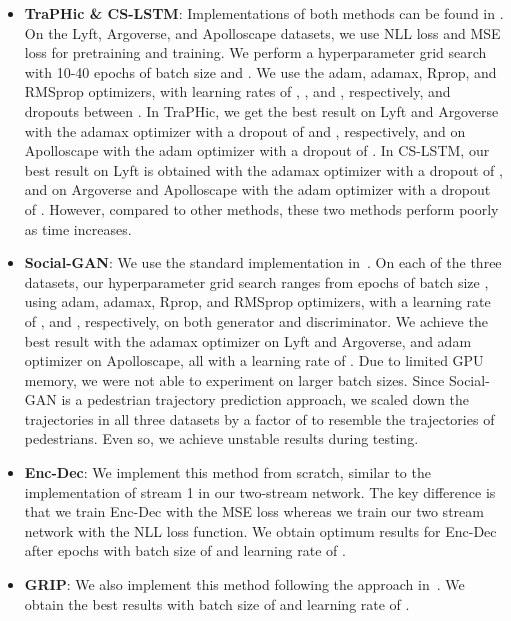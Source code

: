 \documentclass[10pt,twocolumn,letterpaper]{article}
\theoremstyle{plain}
\begin{document}
\begin{itemize}
    \item \textbf{TraPHic \& CS-LSTM}: Implementations of both methods can be found in \cite{chandra2019robusttp}. On the Lyft, Argoverse, and Apolloscape datasets, we use NLL loss and MSE loss for pretraining and training. We perform a hyperparameter grid search with 10-40 epochs of batch size  and . We use the adam, adamax, Rprop, and RMSprop optimizers, with learning rates of , , and , respectively, and dropouts between . In TraPHic, we get the best result on Lyft and Argoverse with the adamax optimizer with a dropout of  and , respectively, and on Apolloscape with the adam optimizer with a dropout of . In CS-LSTM, our best result on Lyft is obtained with the adamax optimizer with a dropout of , and on Argoverse and Apolloscape with the adam optimizer with a dropout of . However, compared to other methods, these two methods perform poorly as time increases.
    
    \item \textbf{Social-GAN}: We use the standard implementation in~\cite{social-gan}. On each of the three datasets, our hyperparameter grid search ranges from  epochs of batch size , using adam, adamax, Rprop, and RMSprop optimizers, with a learning rate of ,  and , respectively, on both generator and discriminator. We achieve the best result with the adamax optimizer on Lyft and Argoverse, and adam optimizer on Apolloscape, all with a learning rate of . Due to limited GPU memory, we were not able to experiment on larger batch sizes. Since Social-GAN is a pedestrian trajectory prediction approach, we scaled down the trajectories in all three datasets by a factor of  to resemble the trajectories of pedestrians. Even so, we achieve unstable results during testing.


    \item \textbf{Enc-Dec}: We implement this method from scratch, similar to the implementation of stream 1 in our two-stream network. The key difference is that we train Enc-Dec with the MSE loss whereas we train our two stream network with the NLL loss function. We obtain optimum results for Enc-Dec after  epochs with batch size of  and learning rate of .

    \item \textbf{GRIP}: We also implement this method following the approach in~\cite{li2019grip}. We obtain the best results with batch size of  and learning rate of . 


    
    
    

\end{itemize}








 
\end{document}
